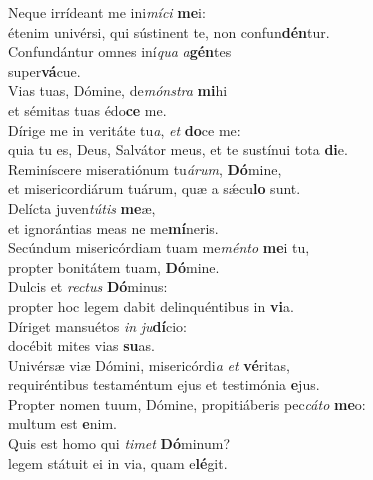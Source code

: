 \evenverse Neque irrídeant me ini\textit{mí}\textit{ci} \textbf{me}i:~\*\\
\evenverse étenim univérsi, qui sústinent te, non confun\textbf{dén}tur.\\
\oddverse Confundántur omnes iní\textit{qua} \textit{a}\textbf{gén}tes~\*\\
\oddverse super\textbf{vá}cue.\\
\evenverse Vias tuas, Dómine, de\textit{món}\textit{stra} \textbf{mi}hi~\*\\
\evenverse et sémitas tuas édo\textbf{ce} me.\\
\oddverse Dírige me in veritáte tu\textit{a}, \textit{et} \textbf{do}ce me:~\*\\
\oddverse quia tu es, Deus, Salvátor meus, et te sustínui tota \textbf{di}e.\\
\evenverse Reminíscere miseratiónum tu\textit{á}\textit{rum}, \textbf{Dó}mine,~\*\\
\evenverse et misericordiárum tuárum, quæ a sǽcu\textbf{lo} sunt.\\
\oddverse Delícta juven\textit{tú}\textit{tis} \textbf{me}æ,~\*\\
\oddverse et ignorántias meas ne me\textbf{mí}neris.\\
\evenverse Secúndum misericórdiam tuam me\textit{mén}\textit{to} \textbf{me}i tu,~\*\\
\evenverse propter bonitátem tuam, \textbf{Dó}mine.\\
\oddverse Dulcis et \textit{re}\textit{ctus} \textbf{Dó}minus:~\*\\
\oddverse propter hoc legem dabit delinquéntibus in \textbf{vi}a.\\
\evenverse Díriget mansuétos \textit{in} \textit{ju}\textbf{dí}cio:~\*\\
\evenverse docébit mites vias \textbf{su}as.\\
\oddverse Univérsæ viæ Dómini, misericórdi\textit{a} \textit{et} \textbf{vé}ritas,~\*\\
\oddverse requiréntibus testaméntum ejus et testimónia \textbf{e}jus.\\
\evenverse Propter nomen tuum, Dómine, propitiáberis pec\textit{cá}\textit{to} \textbf{me}o:~\*\\
\evenverse multum est \textbf{e}nim.\\
\oddverse Quis est homo qui \textit{ti}\textit{met} \textbf{Dó}minum?~\*\\
\oddverse legem státuit ei in via, quam e\textbf{lé}git.\\
